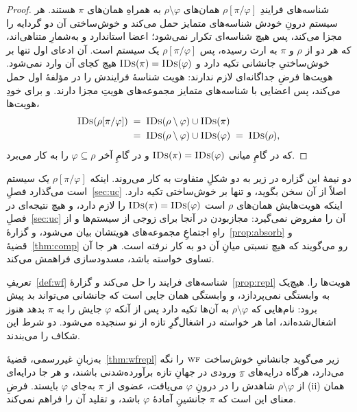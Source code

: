 \documentclass[10pt,oneside,openany]{book}
\newcommand{\WF}{\op{wf}}
\newcommand{\op}[1]{\textnormal{\textsc{#1}}}
\newcommand{\IDs}{\op{IDs}}
\theoremstyle{accentdef}
\theoremstyle{accentplain}
\begin{document}
\begin{proof}
شناسه‌های فرایندِ $\rho[\pi/\varphi]$ همان‌های $\rho \setminus \varphi$ به
همراهِ همان‌های $\pi$ هستند. هر سیستم درونِ خودش شناسه‌های متمایز حمل
می‌کند و خوش‌ساختی آن دو گردایه را مجزا می‌کند، پس هیچ شناسه‌ای تکرار
نمی‌شود؛ اعضا استاندارد و به‌شمارِ متناهی‌اند، که هر دو از $\rho$ و $\pi$
به ارث رسیده، پس $\rho[\pi/\varphi]$ یک سیستم است. آن ادعای اول تنها بر
خوش‌ساختیِ جانشانی تکیه دارد و $\IDs(\pi) = \IDs(\varphi)$ هیچ کجای آن
وارد نمی‌شود. هویت‌ها فرضِ جداگانه‌ای لازم ندارند: هویت شناسهٔ فرایندش را
در مؤلفهٔ اول حمل می‌کند، پس اعضایی با شناسه‌های متمایز مجموعه‌های هویتِ
مجزا دارند. و برای خودِ هویت‌ها،
\[
  \begin{aligned}
  \IDs(\rho[\pi/\varphi]) &\;=\; \IDs(\rho \setminus \varphi) \cup \IDs(\pi) \\
  &\;=\; \IDs(\rho \setminus \varphi) \cup \IDs(\varphi) \;=\; \IDs(\rho),
  \end{aligned}
\]
که در گامِ میانی $\IDs(\pi) = \IDs(\varphi)$ و در گامِ آخر $\varphi
\subseteq \rho$ را به کار می‌برد.
\end{proof}

دو نیمهٔ این گزاره در زیر به دو شکلِ متفاوت به کار می‌روند. اینکه
$\rho[\pi/\varphi]$ یک سیستم است می‌گذارد فصلِ~\ref{sec:uc} اصلاً از آن
سخن بگوید، و تنها بر خوش‌ساختی تکیه دارد. اینکه هویت‌هایش همان‌های $\rho$
است $\IDs(\pi) = \IDs(\varphi)$ را لازم دارد، و هیچ نتیجه‌ای در
فصلِ~\ref{sec:uc} آن را مفروض نمی‌گیرد: مجازبودن در آنجا برای زوجی از
سیستم‌ها و از راهِ اجتماعِ مجموعه‌های هویتشان بیان می‌شود، و
گزارهٔ~\ref{prop:absorb} و قضیهٔ~\ref{thm:comp} رو می‌گویند که هیچ نسبتی
میانِ آن دو به کار نرفته است. هر جا آن تساوی خواسته باشد، مسدودسازی
فراهمش می‌کند.

تعریفِ~\ref{def:wf} شناسه‌های فرایند را حل می‌کند و
گزارهٔ~\ref{prop:repl} هویت‌ها را. هیچ‌یک به وابستگی نمی‌پردازد، و
وابستگی همان جایی است که جانشانی می‌تواند بد پیش برود: نام‌هایی که $\rho
\setminus \varphi$ به آن‌ها تکیه دارد پس از آنکه $\varphi$ جایش را به
$\pi$ بدهد هنوز اشغال‌شده‌اند، اما هر خواسته در اشغال‌گرِ تازه از نو
سنجیده می‌شود. دو شرط این شکاف را می‌بندند.

به‌زبانِ غیررسمی، قضیهٔ~\ref{thm:wfrepl}ِ زیر می‌گوید جانشانیِ خوش‌ساخت
$\WF$ را نگه می‌دارد، هرگاه درایه‌های $\pi$ِ ورودی در جهانِ تازه
برآورده‌شدنی باشند، و هر جا درایه‌ای از $\rho \setminus \varphi$ شاهدش را
در درونِ $\varphi$ می‌یافت، عضوی از $\pi$ به‌جای $\varphi$ بایستد. فرضِ
(ii) همان معنای این است که $\pi$ جانشینِ آمادهٔ $\varphi$ باشد، و تقلید
آن را فراهم نمی‌کند.
\end{document}
